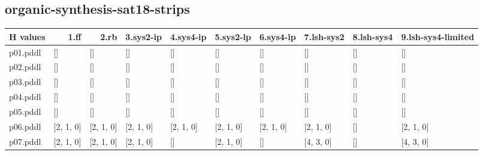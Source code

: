 \documentclass{article}
\begin{document}
\hypertarget{h_values-organic-synthesis-sat18-strips}{}
\subsection*{organic-synthesis-sat18-strips}

\begin{tabular}{@{}lrrrrrrrrr@{}}
H values & 1.ff & 2.rb & 3.sys2-ip & 4.sys4-ip & 5.sys2-lp & 6.sys4-lp & 7.lsh-sys2 & 8.lsh-sys4 & 9.lsh-sys4-limited \\
\midrule
p01.pddl & \multicolumn{1}{|l|}{[]} & \multicolumn{1}{|l|}{[]} & \multicolumn{1}{|l|}{[]} & \multicolumn{1}{|l|}{[]} & \multicolumn{1}{|l|}{[]} & \multicolumn{1}{|l|}{[]} & \multicolumn{1}{|l|}{[]} & \multicolumn{1}{|l|}{[]} & \multicolumn{1}{|l|}{[]} \\
p02.pddl & \multicolumn{1}{|l|}{[]} & \multicolumn{1}{|l|}{[]} & \multicolumn{1}{|l|}{[]} & \multicolumn{1}{|l|}{[]} & \multicolumn{1}{|l|}{[]} & \multicolumn{1}{|l|}{[]} & \multicolumn{1}{|l|}{[]} & \multicolumn{1}{|l|}{[]} & \multicolumn{1}{|l|}{[]} \\
p03.pddl & \multicolumn{1}{|l|}{[]} & \multicolumn{1}{|l|}{[]} & \multicolumn{1}{|l|}{[]} & \multicolumn{1}{|l|}{[]} & \multicolumn{1}{|l|}{[]} & \multicolumn{1}{|l|}{[]} & \multicolumn{1}{|l|}{[]} & \multicolumn{1}{|l|}{[]} & \multicolumn{1}{|l|}{[]} \\
p04.pddl & \multicolumn{1}{|l|}{[]} & \multicolumn{1}{|l|}{[]} & \multicolumn{1}{|l|}{[]} & \multicolumn{1}{|l|}{[]} & \multicolumn{1}{|l|}{[]} & \multicolumn{1}{|l|}{[]} & \multicolumn{1}{|l|}{[]} & \multicolumn{1}{|l|}{[]} & \multicolumn{1}{|l|}{[]} \\
p05.pddl & \multicolumn{1}{|l|}{[]} & \multicolumn{1}{|l|}{[]} & \multicolumn{1}{|l|}{[]} & \multicolumn{1}{|l|}{[]} & \multicolumn{1}{|l|}{[]} & \multicolumn{1}{|l|}{[]} & \multicolumn{1}{|l|}{[]} & \multicolumn{1}{|l|}{[]} & \multicolumn{1}{|l|}{[]} \\
p06.pddl & \multicolumn{1}{|l|}{[2, 1, 0]} & \multicolumn{1}{|l|}{[2, 1, 0]} & \multicolumn{1}{|l|}{[2, 1, 0]} & \multicolumn{1}{|l|}{[2, 1, 0]} & \multicolumn{1}{|l|}{[2, 1, 0]} & \multicolumn{1}{|l|}{[2, 1, 0]} & \multicolumn{1}{|l|}{[2, 1, 0]} & \multicolumn{1}{|l|}{[]} & \multicolumn{1}{|l|}{[2, 1, 0]} \\
p07.pddl & \multicolumn{1}{|l|}{[2, 1, 0]} & \multicolumn{1}{|l|}{[2, 1, 0]} & \multicolumn{1}{|l|}{[2, 1, 0]} & \multicolumn{1}{|l|}{[]} & \multicolumn{1}{|l|}{[2, 1, 0]} & \multicolumn{1}{|l|}{[]} & \multicolumn{1}{|l|}{[4, 3, 0]} & \multicolumn{1}{|l|}{[]} & \multicolumn{1}{|l|}{[4, 3, 0]} \\

\end{tabular}
\end{document}
